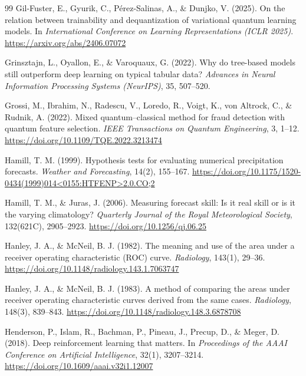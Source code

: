 \documentclass[11pt,a4paper]{article}
\begin{document}
\begin{thebibliography}{99}
Gil-Fuster, E., Gyurik, C., P\'erez-Salinas, A., \& Dunjko, V. (2025). On the relation between trainability and dequantization of variational quantum learning models. In \textit{International Conference on Learning Representations (ICLR 2025)}. \url{https://arxiv.org/abs/2406.07072}

Grinsztajn, L., Oyallon, E., \& Varoquaux, G. (2022). Why do tree-based models still outperform
deep learning on typical tabular data? \textit{Advances in Neural Information Processing
Systems (NeurIPS)}, 35, 507--520.

Grossi, M., Ibrahim, N., Radescu, V., Loredo, R., Voigt, K., von Altrock, C., \& Rudnik, A. (2022). Mixed quantum--classical method for fraud detection with quantum feature selection. \textit{IEEE Transactions on Quantum Engineering}, 3, 1--12. \url{https://doi.org/10.1109/TQE.2022.3213474}

Hamill, T. M. (1999). Hypothesis tests for evaluating numerical precipitation forecasts. \textit{Weather and Forecasting}, 14(2), 155--167. \url{https://doi.org/10.1175/1520-0434(1999)014<0155:HTFENP>2.0.CO;2}

Hamill, T. M., \& Juras, J. (2006). Measuring forecast skill: Is it real skill or is it the varying climatology? \textit{Quarterly Journal of the Royal Meteorological Society}, 132(621C), 2905--2923. \url{https://doi.org/10.1256/qj.06.25}

Hanley, J. A., \& McNeil, B. J. (1982). The meaning and use of the area under a receiver operating characteristic (ROC) curve. \textit{Radiology}, 143(1), 29--36. \url{https://doi.org/10.1148/radiology.143.1.7063747}

Hanley, J. A., \& McNeil, B. J. (1983). A method of comparing the areas under receiver operating characteristic curves derived from the same cases. \textit{Radiology}, 148(3), 839--843. \url{https://doi.org/10.1148/radiology.148.3.6878708}

Henderson, P., Islam, R., Bachman, P., Pineau, J., Precup, D., \& Meger, D. (2018). Deep reinforcement learning that matters. In \textit{Proceedings of the AAAI Conference on Artificial Intelligence}, 32(1), 3207--3214. \url{https://doi.org/10.1609/aaai.v32i1.12007}


\end{thebibliography}
\end{document}
